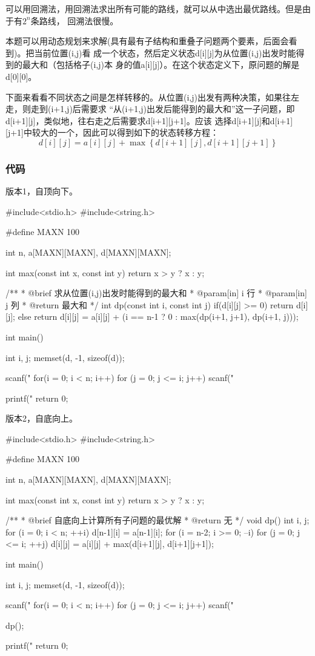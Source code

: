 可以用回溯法，用回溯法求出所有可能的路线，就可以从中选出最优路线。但是由于有$2^n$条路线，
回溯法很慢。

本题可以用动态规划来求解(具有最有子结构和重叠子问题两个要素，后面会看到)。把当前位置(i,j)看
成一个状态，然后定义状态d[i][j]为从位置(i,j)出发时能得到的最大和（包括格子(i,j)本
身的值a[i][j]）。在这个状态定义下，原问题的解是d[0][0]。

下面来看看不同状态之间是怎样转移的。从位置(i,j)出发有两种决策，如果往左走，则走到(i+1,j)后需要求
“从(i+1,j)出发后能得到的最大和”这一子问题，即d[i+1][j]，类似地，往右走之后需要求d[i+1][j+1]。应该
选择d[i+1][j]和d[i+1][j+1]中较大的一个，因此可以得到如下的状态转移方程：
$$d[i][j]=a[i][j]+\max\left\{d[i+1][j], d[i+1][j+1]\right\}$$

\subsubsection{代码}
版本1，自顶向下。

\begin{Codex}[label=numbers_triangle1.c]
#include<stdio.h>
#include<string.h>

#define MAXN 100

int n, a[MAXN][MAXN], d[MAXN][MAXN];

int max(const int x, const int y) {
    return x > y ? x : y;
}

/**
 * @brief 求从位置(i,j)出发时能得到的最大和
 * @param[in] i 行
 * @param[in] j 列
 * @return 最大和
 */
int dp(const int i, const int j) {
    if(d[i][j] >= 0) {
        return d[i][j];
    } else {
        return d[i][j] = a[i][j] + (i == n-1 ? 0 : max(dp(i+1, j+1), dp(i+1, j)));
    }
}

int main() {
    int i, j;
    memset(d, -1, sizeof(d));

    scanf("%
    for(i = 0; i < n; i++)
      for (j = 0; j <= i; j++) scanf("%
    
    printf("%
    return 0;
}
\end{Codex}

版本2，自底向上。

\begin{Codex}[label=numbers_triangle2.c]
#include<stdio.h>
#include<string.h>

#define MAXN 100

int n, a[MAXN][MAXN], d[MAXN][MAXN];

int max(const int x, const int y) {
    return x > y ? x : y;
}

/**
 * @brief 自底向上计算所有子问题的最优解
 * @return 无
 */
void dp() {
    int i, j;
    for (i = 0; i < n; ++i) {
        d[n-1][i] = a[n-1][i];
    }
    for (i = n-2; i >= 0; --i)
      for (j = 0; j <= i; ++j)
        d[i][j] = a[i][j] + max(d[i+1][j], d[i+1][j+1]);
}

int main() {
    int i, j;
    memset(d, -1, sizeof(d));

    scanf("%
    for(i = 0; i < n; i++)
      for (j = 0; j <= i; j++) 
          scanf("%

    dp();
    
    printf("%
    return 0;
}
\end{Codex}

